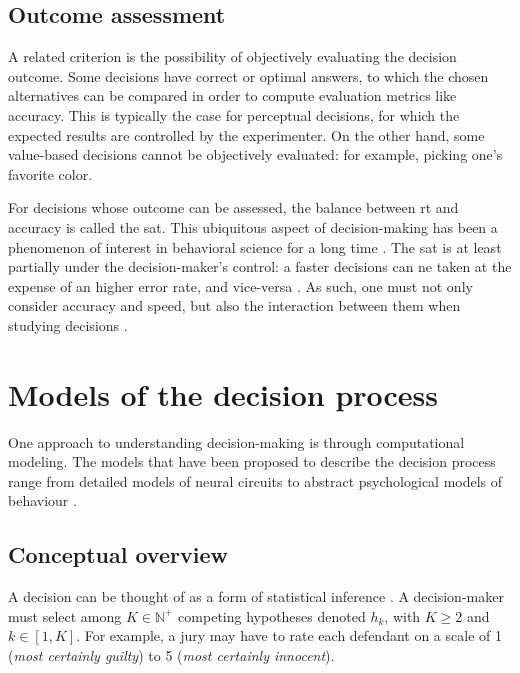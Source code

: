 \subsection{Outcome assessment}

A related criterion is the possibility of objectively evaluating the decision outcome. Some decisions have correct or optimal answers, to which the chosen alternatives can be compared in order to compute evaluation metrics like \gls{accuracy}. This is typically the case for perceptual decisions, for which the expected results are controlled by the experimenter. On the other hand, some value-based decisions cannot be objectively evaluated: for example, picking one's favorite color.

For decisions whose outcome can be assessed, the balance between \acrshort{rt} and accuracy is called the \acrfull{sat}. This ubiquitous aspect of decision-making has been a phenomenon of interest in behavioral science for a long time \cite{heitzSpeedaccuracyTradeoffHistory2014}. The \acrshort{sat} is at least partially under the decision-maker's control: a faster decisions can ne taken at the expense of an higher error rate, and vice-versa \cite{ratcliffDiffusionDecisionModel2016}. As such, one must not only consider accuracy and speed, but also the interaction between them when studying decisions \cite{myersPracticalIntroductionUsing2022}.

\section{Models of the decision process}

One approach to understanding decision-making is through computational modeling. The models that have been proposed to describe the decision process range from detailed models of neural circuits to abstract psychological models of behaviour \cite{bogaczOptimalDecisionmakingTheories2007}.

\subsection{Conceptual overview}

A decision can be thought of as a form of statistical inference \cite{goldNeuralBasisDecision2007}. A decision-maker must select among $K \in \mathbb{N^{+}}$ competing hypotheses denoted $h_k$, with $K \ge 2$ and $k \in [1,K]$. For example, a jury may have to rate each defendant on a scale of 1 (\textit{most certainly guilty}) to 5 (\textit{most certainly innocent}).

